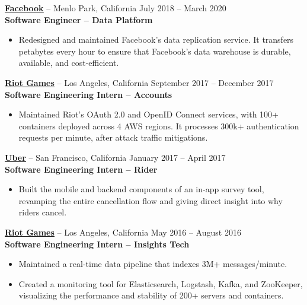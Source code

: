 \documentclass{letter}
\begin{document}
\vspace{-1.5mm}
{\bfseries \href{http://facebook.com}{\uline{Facebook}}} -- Menlo Park,
California \hfill July 2018 -- March 2020 \\
{\bfseries Software Engineer -- Data Platform}
\vspace{-3mm}
\begin{itemize}
    \item Redesigned and maintained Facebook's data replication service. It
      transfers petabytes every hour to ensure that Facebook's data warehouse
      is durable, available, and cost-efficient.
\end{itemize}

\vspace{-1.5mm}
{\bfseries \href{http://riotgames.com}{\uline{Riot Games}}} -- Los Angeles,
California \hfill September 2017 -- December 2017\\
{\bfseries Software Engineering Intern -- Accounts}
\vspace{-3mm}
\begin{itemize}
    \item Maintained Riot's OAuth 2.0 and OpenID Connect services, with 100+
      containers deployed across 4 AWS regions. It processes 300k+
      authentication requests per minute, after attack traffic mitigations.
\end{itemize}

\vspace{-1.5mm}
{\bfseries \href{http://uber.com}{\uline{Uber}}} -- San Francisco,
California \hfill January 2017 -- April 2017\\
{\bfseries Software Engineering Intern -- Rider}
\vspace{-3mm}
\begin{itemize}
    \item Built the mobile and backend components of an in-app survey tool,
      revamping the entire cancellation flow and giving direct insight into
      why riders cancel.
\end{itemize}

\vspace{-1.5mm}
{\bfseries \href{http://riotgames.com}{\uline{Riot Games}}} -- Los Angeles,
California \hfill May 2016 -- August 2016\\
{\bfseries Software Engineering Intern -- Insights Tech}
\vspace{-3mm}
\begin{itemize}
    \item Maintained a real-time data pipeline that indexes 3M+ messages/minute.
    \item Created a monitoring tool for Elasticsearch, Logstash, Kafka, and
      ZooKeeper, visualizing the performance and stability of 200+ servers and
      containers.
\end{itemize}
\end{document}
